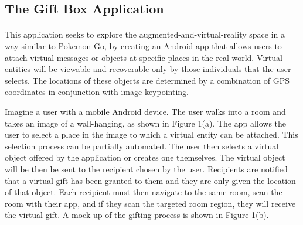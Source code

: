 \subsection{The Gift Box Application}
\paragraph{}
This application seeks to explore the augmented-and-virtual-reality space in a way similar to Pokemon Go, by creating an Android app that allows users to attach virtual messages or objects at specific places in the real world. Virtual entities will be viewable and recoverable only by those individuals that the user selects. The locations of these objects are determined by a combination of GPS coordinates in conjunction with image keypointing.
\par Imagine a user with a mobile Android device. The user walks into a room and takes an image of a wall-hanging, as shown in Figure 1(a). The app allows the user to select a place in the image to which a virtual entity can be attached. This selection process can be partially automated. The user then selects a virtual object offered by the application or creates one themselves. The virtual object will be then be sent to the recipient chosen by the user. Recipients are notified that a virtual gift has been granted to them and they are only given the location of that object. Each recipient must then navigate to the same room, scan the room with their app, and if they scan the targeted room region, they will receive the virtual gift. A mock-up of the gifting process is shown in Figure 1(b).

